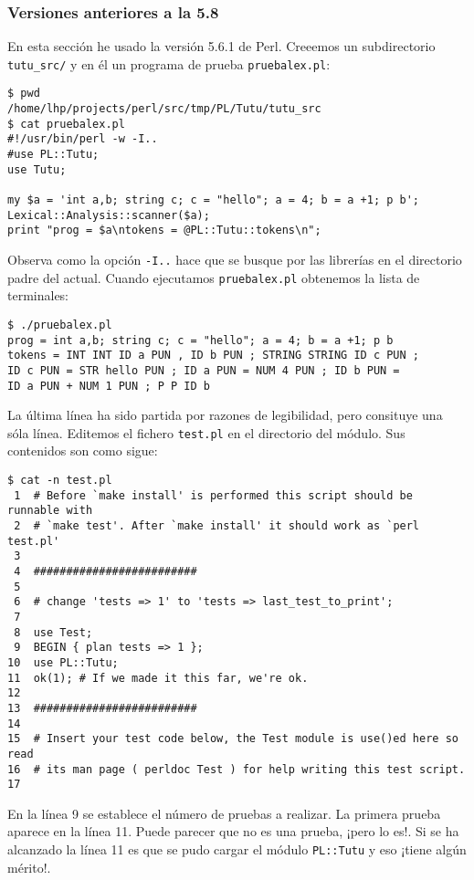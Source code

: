 \subsubsection{Versiones anteriores a la 5.8}
En esta sección he usado la versión 5.6.1 de Perl.  
Creeemos un subdirectorio \verb|tutu_src/| y en él un programa de prueba
\verb|pruebalex.pl|:
\begin{verbatim}
$ pwd
/home/lhp/projects/perl/src/tmp/PL/Tutu/tutu_src
$ cat pruebalex.pl
#!/usr/bin/perl -w -I..
#use PL::Tutu;
use Tutu;

my $a = 'int a,b; string c; c = "hello"; a = 4; b = a +1; p b';
Lexical::Analysis::scanner($a);
print "prog = $a\ntokens = @PL::Tutu::tokens\n";
\end{verbatim}
Observa como la opción \verb|-I..| hace que se busque por las librerías en el directorio
padre del actual.
Cuando ejecutamos \verb|pruebalex.pl| obtenemos la lista de terminales:
\begin{verbatim}
$ ./pruebalex.pl
prog = int a,b; string c; c = "hello"; a = 4; b = a +1; p b
tokens = INT INT ID a PUN , ID b PUN ; STRING STRING ID c PUN ; 
ID c PUN = STR hello PUN ; ID a PUN = NUM 4 PUN ; ID b PUN = 
ID a PUN + NUM 1 PUN ; P P ID b
\end{verbatim}
La última línea ha sido partida por razones de legibilidad, pero consituye 
una sóla línea.
Editemos el fichero \verb|test.pl| en el directorio del módulo.
Sus contenidos son como sigue:
\begin{verbatim}
$ cat -n test.pl
 1  # Before `make install' is performed this script should be runnable with
 2  # `make test'. After `make install' it should work as `perl test.pl'
 3
 4  #########################
 5
 6  # change 'tests => 1' to 'tests => last_test_to_print';
 7
 8  use Test;
 9  BEGIN { plan tests => 1 };
10  use PL::Tutu;
11  ok(1); # If we made it this far, we're ok.
12
13  #########################
14
15  # Insert your test code below, the Test module is use()ed here so read
16  # its man page ( perldoc Test ) for help writing this test script.
17
\end{verbatim}
En la línea 9 se establece el número de pruebas a realizar. 
La primera prueba aparece en la línea 11. Puede parecer que no es una prueba,
¡pero lo es!. Si se ha alcanzado la línea 11 es que se pudo cargar
el módulo \verb|PL::Tutu| y eso ¡tiene algún mérito!.

